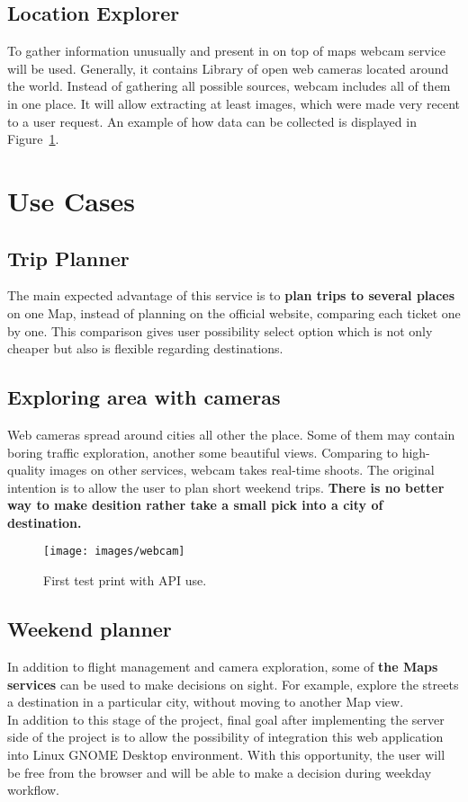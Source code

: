 \documentclass[12pt]{article}
\numberwithin{equation}{section} %
\numberwithin{figure}{section} %
\numberwithin{table}{section} %
\begin{document}
	\subsection{Location Explorer}
		$  $ \\
		
		To gather information unusually and present in on top of maps webcam service will be used. Generally, it contains Library of open web cameras located around the world. Instead of gathering all possible sources, webcam includes all of them in one place. It will allow extracting at least images, which were made very recent to a user request. An example of how data can be collected is displayed in Figure~\ref{fig:webcam}.
\section{Use Cases}
	\subsection{Trip Planner}
	The main expected advantage of this service is to \textbf{plan trips to several places} on one Map, instead of planning on the official website, comparing each ticket one by one. This comparison gives user possibility select option which is not only cheaper but also is flexible regarding destinations.
	
	\subsection{Exploring area with cameras}
	Web cameras spread around cities all other the place. Some of them may contain boring traffic exploration, another some beautiful views. Comparing to high-quality images on other services, webcam takes real-time shoots. The original intention is to allow the user to plan short weekend trips. \textbf{There is no better way to make desition rather take a small pick into a city of destination.}
	\begin{figure}[H]
		\centering        
		\texttt{[image: images/webcam]}
		\caption{First test print with API use.}
		\label{fig:webcam}
	\end{figure}
	\subsection{Weekend planner}
	In addition to flight management and camera exploration, some of \textbf{the Maps services} can be used to make decisions on sight. For example, explore the streets a destination in a particular city, without moving to another Map view. \\
	In addition to this stage of the project, final goal after implementing the server side of the project is to allow the possibility of integration this web application into Linux GNOME Desktop environment. With this opportunity, the user will be free from the browser and will be able to make a decision during weekday workflow.
	
\end{document}
